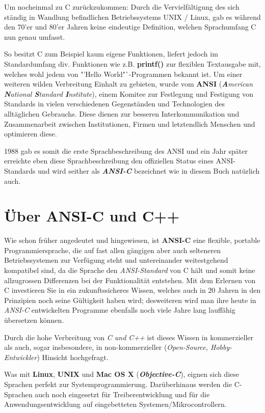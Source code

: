 \documentclass[a4paper,10pt,dvips,fleqn,titlepage,twoside]{book}
\begin{document}
Um nocheinmal zu C zurückzukommen: Durch die Vervielfältigung des sich ständig in Wandlung befindlichen Betriebssystems UNIX / Linux, gab es während den 70'er und 80'er Jahren keine eindeutige Definition, welchen Sprachumfang C nun genau umfasst.

So besitzt C zum Beispiel kaum eigene Funktionen, liefert jedoch im Standardumfang div. Funktionen wie z.B. \textbf{printf()} zur flexiblen Textausgabe mit, welches wohl jedem von "'Hello World"`-Programmen bekannt ist.
Um einer weiteren wilden Verbreitung Einhalt zu gebieten, wurde vom \textbf{ANSI} (\emph{\textbf{A}merican \textbf{N}ational \textbf{S}tandard \textbf{I}nstitute}), einem Komitee zur Festlegung und Festigung von Standards in vielen verschiedenen Gegenständen und Technologien des alltäglichen Gebrauchs. Diese dienen zur besseren Interkommunikation und Zusammenarbeit zwischen Institutionen, Firmen und letztendlich Menschen und optimieren diese.

1988 gab es somit die erste Sprachbeschreibung des ANSI und ein Jahr später erreichte eben diese Sprachbeschreibung den offiziellen Status eines ANSI-Standards und wird seither als \textbf{\emph{ANSI-C}} bezeichnet \lbrack wie in diesem Buch natürlich auch.\rbrack
\newline
\section{Über ANSI-C und C++}
Wie schon früher angedeutet und hingewiesen, ist \textbf{ANSI-C} eine flexible, portable Programmiersprache, die auf fast allen gängigen aber auch selteneren Betriebssystemen zur Verfügung steht und untereinander weitestgehend kompatibel sind, da die Sprache den \emph{ANSI-Standard} von C hält und somit keine allzugrossen Differenzen bei der Funktionalität entstehen.
Mit dem Erlernen von C investieren Sie in ein zukunftssicheres Wissen, welches auch in 20 Jahren in den Prinzipien noch seine Gültigkeit haben wird; desweiteren wird man ihre heute in \emph{ANSI-C} entwickelten Programme ebenfalls noch viele Jahre lang lauffähig übersetzen können.

Durch die hohe Verbreitung von \emph{C und C++} ist dieses Wissen in kommerzieller als auch, sogar insbesondere, in non-kommerzieller (\emph{Open-Source, Hobby-Entwickler}) Hinsicht hochgefragt.

Was mit \textbf{Linux}, \textbf{UNIX} und \textbf{Mac OS X} (\emph{\textbf{Objective-C}}), eignen sich diese Sprachen perfekt zur Systemprogrammierung. Darüberhinaus werden die C-Sprachen auch noch eingesetzt für Treiberentwicklung und für die Anwendungsentwicklung auf eingebetteten Systemen/Mikrocontrollern.
\end{document}
